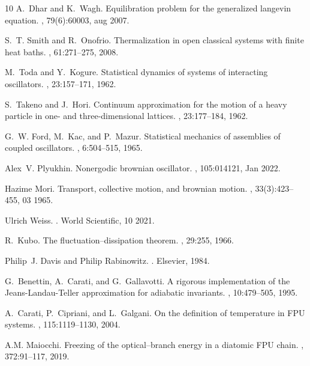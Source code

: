 \documentclass[11pt]{article}
\numberwithin{equation}{section}
\numberwithin{theorem}{section}
\begin{document}
\begin{thebibliography}{10}
A.~Dhar and K.~Wagh.
\newblock Equilibration problem for the generalized langevin equation.
, 79(6):60003, aug 2007.

S.~T. Smith and R.~Onofrio.
\newblock Thermalization in open classical systems with finite heat baths.
, 61:271--275, 2008.

M.~Toda and Y.~Kogure.
\newblock Statistical dynamics of systems of interacting oscillators.
, 23:157--171,
  1962.

S.~Takeno and J.~Hori.
\newblock Continuum approximation for the motion of a heavy particle in one-
  and three-dimensional lattices.
, 23:177--184,
  1962.

G.~W. Ford, M.~Kac, and P.~Mazur.
\newblock Statistical mechanics of assemblies of coupled oscillators.
, 6:504--515, 1965.

Alex~V. Plyukhin.
\newblock Nonergodic brownian oscillator.
, 105:014121, Jan 2022.

Hazime Mori.
\newblock Transport, collective motion, and brownian motion.
, 33(3):423--455, 03 1965.

Ulrich Weiss.
.
\newblock World Scientific, 10 2021.

R.~Kubo.
\newblock The fluctuation--dissipation theorem.
, 29:255, 1966.

Philip~J. Davis and Philip Rabinowitz.
.
\newblock Elsevier, 1984.

G.~Benettin, A.~Carati, and G.~Gallavotti.
\newblock A rigorous implementation of the {J}eans-{L}andau-{T}eller
  approximation for adiabatic invariants.
, 10:479--505, 1995.

A.~Carati, P.~Cipriani, and L.~Galgani.
\newblock On the definition of temperature in {FPU} systems.
, 115:1119--1130, 2004.

A.M. Maiocchi.
\newblock Freezing of the optical–branch energy in a diatomic {FPU} chain.
, 372:91--117, 2019.

\end{thebibliography}
\end{document}
